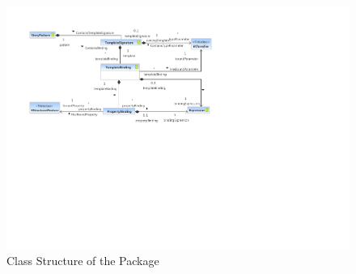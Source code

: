 %
%

\begin{figure}[htb]
  \centering
  \includegraphics[width=\textwidth]{figures/A_technical-reference/packages/storydiagrams_templates/sdm-templates}
  \caption{Class Structure of the  Package}
  \label{fig:MM:templates}
\end{figure}
